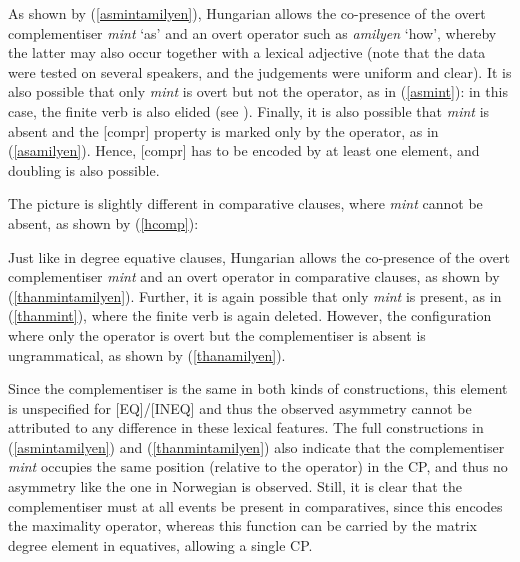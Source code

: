 As shown by (\ref{asmintamilyen}), Hungarian allows the co-presence of the overt complementiser \textit{mint} `as' and an overt operator such as \textit{amilyen} `how', whereby the latter may also occur together with a lexical adjective (note that the data were tested on several speakers, and the judgements were uniform and clear). It is also possible that only \textit{mint} is overt but not the operator, as in (\ref{asmint}): in this case, the finite verb is also elided (see \citealt[173--196]{bacskaiatkari2018langsci}). Finally, it is also possible that \textit{mint} is absent and the [compr] property is marked only by the operator, as in (\ref{asamilyen}). Hence, [compr] has to be encoded by at least one element, and doubling is also possible.

The picture is slightly different in comparative clauses, where \textit{mint} cannot be absent, as shown by (\ref{hcomp}):

\ea \label{hcomp}
\z
\z

Just like in degree equative clauses, Hungarian allows the co-presence of the overt complementiser \textit{mint} and an overt operator in comparative clauses, as shown by (\ref{thanmintamilyen}). Further, it is again possible that only \textit{mint} is present, as in (\ref{thanmint}), where the finite verb is again deleted. However, the configuration where only the operator is overt but the complementiser is absent is ungrammatical, as shown by (\ref{thanamilyen}).

Since the complementiser is the same in both kinds of constructions, this element is unspecified for [EQ]/[INEQ] and thus the observed asymmetry cannot be attributed to any difference in these lexical features. The full constructions in (\ref{asmintamilyen}) and (\ref{thanmintamilyen}) also indicate that the complementiser \textit{mint} occupies the same position (relative to the operator) in the CP, and thus no asymmetry like the one in Norwegian is observed. Still, it is clear that the complementiser must at all events be present in comparatives, since this encodes the maximality operator, whereas this function can be carried by the matrix degree element in equatives, allowing a single CP.

